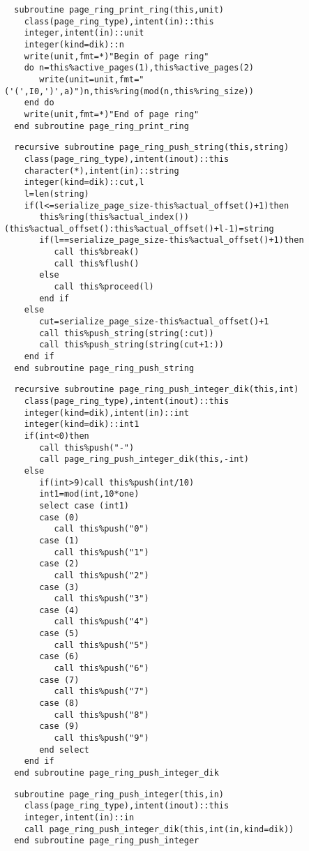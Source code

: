 \begin{Verbatim}
  subroutine page_ring_print_ring(this,unit)
    class(page_ring_type),intent(in)::this
    integer,intent(in)::unit
    integer(kind=dik)::n
    write(unit,fmt=*)"Begin of page ring"
    do n=this%active_pages(1),this%active_pages(2)
       write(unit=unit,fmt="('(',I0,')',a)")n,this%ring(mod(n,this%ring_size))
    end do
    write(unit,fmt=*)"End of page ring"
  end subroutine page_ring_print_ring
\end{Verbatim}
  
\begin{Verbatim}
  recursive subroutine page_ring_push_string(this,string)
    class(page_ring_type),intent(inout)::this
    character(*),intent(in)::string
    integer(kind=dik)::cut,l
    l=len(string)
    if(l<=serialize_page_size-this%actual_offset()+1)then
       this%ring(this%actual_index())(this%actual_offset():this%actual_offset()+l-1)=string
       if(l==serialize_page_size-this%actual_offset()+1)then
          call this%break()
          call this%flush()
       else
          call this%proceed(l)
       end if       
    else
       cut=serialize_page_size-this%actual_offset()+1
       call this%push_string(string(:cut))
       call this%push_string(string(cut+1:))
    end if
  end subroutine page_ring_push_string
\end{Verbatim}

\begin{Verbatim}
  recursive subroutine page_ring_push_integer_dik(this,int)
    class(page_ring_type),intent(inout)::this
    integer(kind=dik),intent(in)::int
    integer(kind=dik)::int1
    if(int<0)then
       call this%push("-")
       call page_ring_push_integer_dik(this,-int)
    else
       if(int>9)call this%push(int/10)
       int1=mod(int,10*one)
       select case (int1)
       case (0)
          call this%push("0")
       case (1)
          call this%push("1")
       case (2)
          call this%push("2")
       case (3)
          call this%push("3")
       case (4)
          call this%push("4")
       case (5)
          call this%push("5")
       case (6)
          call this%push("6")
       case (7)
          call this%push("7")
       case (8)
          call this%push("8")
       case (9)
          call this%push("9")
       end select
    end if
  end subroutine page_ring_push_integer_dik
\end{Verbatim}

\begin{Verbatim}
  subroutine page_ring_push_integer(this,in)
    class(page_ring_type),intent(inout)::this
    integer,intent(in)::in
    call page_ring_push_integer_dik(this,int(in,kind=dik))
  end subroutine page_ring_push_integer
\end{Verbatim}

